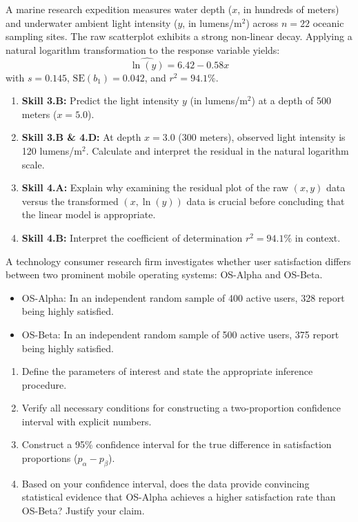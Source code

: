 \begin{workbookbox}
A marine research expedition measures water depth ($x$, in hundreds of meters) and underwater ambient light intensity ($y$, in lumens/$\text{m}^2$) across $n = 22$ oceanic sampling sites. The raw scatterplot exhibits a strong non-linear decay. Applying a natural logarithm transformation to the response variable yields:
\[ \widehat{\ln(y)} = 6.42 - 0.58x \]
with $s = 0.145$, $\text{SE}(b_1) = 0.042$, and $r^2 = 94.1\%$.
\begin{enumerate}[label=(\alph*)]
  \item \textbf{Skill 3.B:} Predict the light intensity $y$ (in lumens/$\text{m}^2$) at a depth of 500 meters ($x = 5.0$).
  \item \textbf{Skill 3.B \& 4.D:} At depth $x = 3.0$ (300 meters), observed light intensity is 120 lumens/$\text{m}^2$. Calculate and interpret the residual in the natural logarithm scale.
  \item \textbf{Skill 4.A:} Explain why examining the residual plot of the raw $(x, y)$ data versus the transformed $(x, \ln(y))$ data is crucial before concluding that the linear model is appropriate.
  \item \textbf{Skill 4.B:} Interpret the coefficient of determination $r^2 = 94.1\%$ in context.
\end{enumerate}
\end{workbookbox}

\begin{workbookbox}
A technology consumer research firm investigates whether user satisfaction differs between two prominent mobile operating systems: OS-Alpha and OS-Beta.
\begin{itemize}
  \item OS-Alpha: In an independent random sample of 400 active users, 328 report being highly satisfied.
  \item OS-Beta: In an independent random sample of 500 active users, 375 report being highly satisfied.
\end{itemize}
\begin{enumerate}[label=(\alph*)]
  \item Define the parameters of interest and state the appropriate inference procedure.
  \item Verify all necessary conditions for constructing a two-proportion confidence interval with explicit numbers.
  \item Construct a 95\% confidence interval for the true difference in satisfaction proportions ($p_\alpha - p_\beta$).
  \item Based on your confidence interval, does the data provide convincing statistical evidence that OS-Alpha achieves a higher satisfaction rate than OS-Beta? Justify your claim.
\end{enumerate}
\end{workbookbox}

